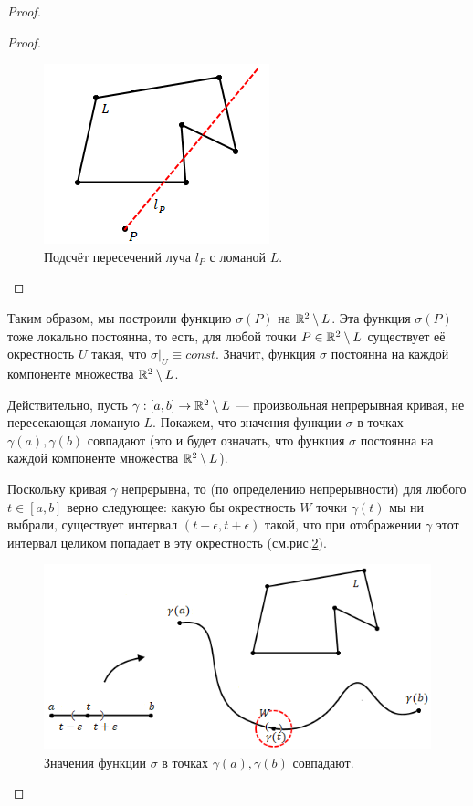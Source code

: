 \begin{proof}
\begin{proof}
        \begin{figure}[htbp]
            \centering
            \includegraphics[scale=1]{images/c4.6.png}
            \caption{Подсчёт пересечений луча $l_P$ с ломаной $L$.}
            \label{fig:c4.6}
        \end{figure}
    \end{proof} 

    Таким образом, мы построили функцию $\sigma(P)$ на $\mathbb{R}^2 \setminus L$. Эта функция $\sigma(P)$ тоже локально постоянна, то есть, для любой точки $P \in \mathbb{R}^2 \setminus L$ существует её окрестность $U$ такая, что $\sigma|_U \equiv const$. Значит, функция $\sigma$ постоянна на каждой компоненте множества $\mathbb{R}^2 \setminus L$.

    Действительно, пусть $\gamma: [a,b] \to \mathbb{R}^2 \setminus L$ — произвольная непрерывная кривая, не пересекающая ломаную $L$. Покажем, что значения функции $\sigma$ в точках $\gamma(a), \gamma(b)$ совпадают (это и будет означать, что функция $\sigma$ постоянна на каждой компоненте множества $\mathbb{R}^2 \setminus L$).

    Поскольку кривая $\gamma$ непрерывна, то (по определению непрерывности) для любого $t \in [a,b]$ верно следующее: какую бы окрестность $W$ точки $\gamma(t)$ мы ни выбрали, существует интервал $(t - \epsilon, t + \epsilon)$ такой, что при отображении $\gamma$ этот интервал целиком попадает в эту окрестность (см.рис.\ref{fig:c4.8}).

    \begin{figure}[htbp]
        \centering
        \includegraphics[scale=0.8]{images/c4.8.png}
        \caption{Значения функции $\sigma$ в точках $\gamma(a), \gamma(b)$ совпадают.}
        \label{fig:c4.8}
    \end{figure}


\end{proof}
